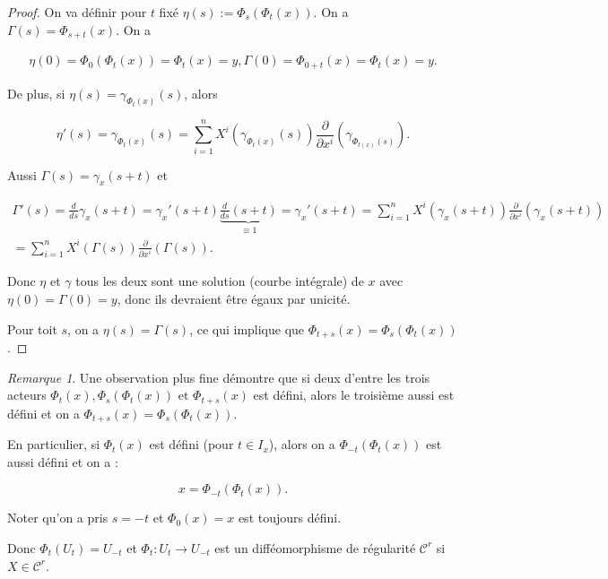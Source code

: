 \documentclass[french]{article}
\theoremstyle{definition}
\theoremstyle{remark}
\newtheorem*{remark}{Remarque}
\begin{document}
\begin{proof}
  On va définir pour \(t\) fixé \(\eta(s) := \Phi_s(\Phi_t(x))\). On a \(\Gamma(s) = \Phi _{s+t}(x)\). On a

  \begin{gather*}
    \eta(0) = \Phi_0(\Phi_t(x)) = \Phi_t(x)=y,
    \Gamma(0) = \Phi _{0+t}(x)= \Phi _{t}(x)=y.
  \end{gather*}

  De plus, si \(\eta(s) = \gamma _{\Phi_t(x)}(s)\), alors

  \[\eta'(s) = \gamma _{\Phi_t(x)}(s) = \sum_{i=1}^{n} X ^{i}(\gamma _{\Phi_t(x)}(s)) \frac{\partial  }{\partial x ^{i}}(\gamma _{\Phi _{t(x)}(s)}).\]

  Aussi \(\Gamma(s) = \gamma_x(s+t)\) et

  \begin{gather*}
    \Gamma'(s) = \frac{d}{ds}\gamma_x(s+t) = \gamma_x'(s+t) \underbrace{\frac{d}{ds}(s+t)}_{\equiv 1} = \gamma_x'(s+t) = \sum_{i=1}^{n} X ^{i}(\gamma_x(s+t)) \frac{\partial  }{\partial x ^{i}}(\gamma_x(s+t))\\
    = \sum_{i=1}^{n} X ^{i}(\Gamma(s)) \frac{\partial  }{\partial x ^{i}}(\Gamma(s)).
  \end{gather*}

  Donc \(\eta\) et \(\gamma\) tous les deux sont une solution (courbe intégrale) de \(x\) avec \(\eta(0) = \Gamma(0)=y\), donc ils devraient être égaux par unicité.

  Pour toit \(s\), on a \(\eta(s) = \Gamma(s)\), ce qui implique que \(\Phi _{t+s}(x) = \Phi_s(\Phi_t(x))\).
\end{proof}

\begin{remark}
  Une observation plus fine démontre que si deux d'entre les trois acteurs \(\Phi_t(x), \Phi_s(\Phi_t(x)) \text{ et } \Phi _{t+s}(x)\) est défini, alors le troisième aussi est défini et on a \(\Phi _{t+s}(x) = \Phi_s(\Phi_t(x))\).

  En particulier, si \(\Phi_t(x)\) est défini (pour \(t \in I_x\)), alors on a \(\Phi _{-t}(\Phi _{t}(x))\) est aussi défini et on a :

  \[x = \Phi _{-t}(\Phi _{t}(x)).\]

  Noter qu'on a pris \(s = -t\) et \(\Phi_0(x) = x\) est toujours défini.

  Donc \(\Phi_t(U_t) = U _{-t}\) et \(\Phi_t : U_t \longrightarrow U _{-t}\) est un difféomorphisme de régularité \(\mathcal{C}^r\) si \(X \in \mathcal{C}^r\).
\end{remark}
\end{document}
